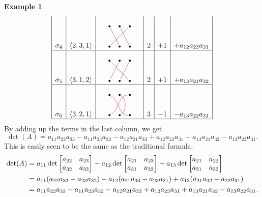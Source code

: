 \documentclass[reqno]{amsart}
\theoremstyle{definition}
\newtheorem{example}[theorem]{Example}
\begin{document}
\begin{example}
\[\begin{array}{|c|c|c|c|c|c|}
   \sg_4 &
   \ip{2,3,1} &
   \begin{tikzpicture}[scale=0.5]
    \draw[white] (0,0) -- (4,3);
    \fill (1,2) circle(0.1);
    \fill (2,2) circle(0.1);
    \fill (3,2) circle(0.1);
    \fill (1,0) circle(0.1);
    \fill (2,0) circle(0.1);
    \fill (3,0) circle(0.1);
    \draw[red,shorten >=1mm,shorten <=1mm] (1,2) -- (2,0);
    \draw[red,shorten >=1mm,shorten <=1mm] (2,2) -- (3,0);
    \draw[red,shorten >=1mm,shorten <=1mm] (3,2) -- (1,0);
   \end{tikzpicture} &
   2 &
   +1 &
   +a_{12}a_{23}a_{31}
   \\ \hline
   \sg_5 &
   \ip{3,1,2} &
   \begin{tikzpicture}[scale=0.5]
    \draw[white] (0,0) -- (4,3);
    \fill (1,2) circle(0.1);
    \fill (2,2) circle(0.1);
    \fill (3,2) circle(0.1);
    \fill (1,0) circle(0.1);
    \fill (2,0) circle(0.1);
    \fill (3,0) circle(0.1);
    \draw[red,shorten >=1mm,shorten <=1mm] (1,2) -- (3,0);
    \draw[red,shorten >=1mm,shorten <=1mm] (2,2) -- (1,0);
    \draw[red,shorten >=1mm,shorten <=1mm] (3,2) -- (2,0);
   \end{tikzpicture} &
   2 &
   +1 &
   +a_{13}a_{21}a_{32}
   \\ \hline
   \sg_6 &
   \ip{3,2,1} &
   \begin{tikzpicture}[scale=0.5]
    \draw[white] (0,0) -- (4,3);
    \fill (1,2) circle(0.1);
    \fill (2,2) circle(0.1);
    \fill (3,2) circle(0.1);
    \fill (1,0) circle(0.1);
    \fill (2,0) circle(0.1);
    \fill (3,0) circle(0.1);
    \draw[red,shorten >=1mm,shorten <=1mm] (1,2) to[out=-30,in=180] (3,0);
    \draw[red,shorten >=1mm,shorten <=1mm] (2,2) to[out=-30,in=30] (2,0);
    \draw[red,shorten >=1mm,shorten <=1mm] (1,0) to[out=30,in=180] (3,2);
   \end{tikzpicture}  &
   3 &
   -1 &
   -a_{13}a_{22}a_{31} \\ \hline
  \end{array}
 \]
 By adding up the terms in the last column, we get
 \[ \det(A) =
     a_{11}a_{22}a_{33}
   - a_{11}a_{23}a_{32}
   - a_{12}a_{21}a_{33}
   + a_{12}a_{23}a_{31}
   + a_{13}a_{21}a_{32}
   - a_{13}a_{22}a_{31}.
 \]
 This is easily seen to be the same as the traditional formula:
 \begin{align*}
  \det(A)
   &=  a_{11}\det\left[\begin{matrix} a_{22}&a_{23} \\ a_{32}&a_{33}\end{matrix}\right]
      -a_{12}\det\left[\begin{matrix} a_{21}&a_{23} \\ a_{31}&a_{33}\end{matrix}\right]
      +a_{13}\det\left[\begin{matrix} a_{21}&a_{22} \\ a_{31}&a_{32}\end{matrix}\right] \\
   &=  a_{11}(a_{22}a_{33}-a_{23}a_{32})
      -a_{12}(a_{21}a_{33}-a_{23}a_{31})
      +a_{13}(a_{21}a_{32}-a_{22}a_{31}) \\
   &=
     a_{11}a_{22}a_{33}
   - a_{11}a_{23}a_{32}
   - a_{12}a_{21}a_{33}
   + a_{12}a_{23}a_{31}
   + a_{13}a_{21}a_{32}
   - a_{13}a_{22}a_{31}.
 \end{align*}
\end{example}
\end{document}
